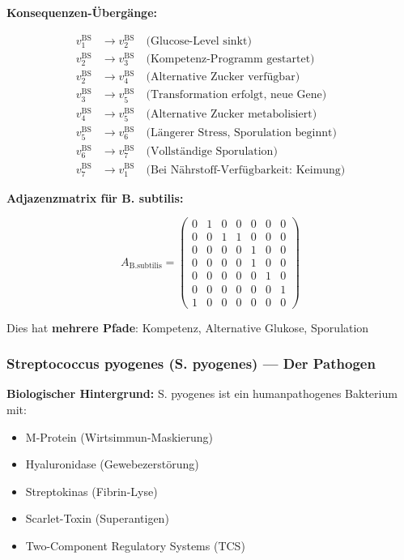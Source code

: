 \documentclass[a4paper,12pt]{article}
\theoremstyle{definition}
\begin{document}
\textbf{Konsequenzen-Übergänge:}

\begin{align*}
v_1^{\text{BS}} &\to v_2^{\text{BS}} \quad \text{(Glucose-Level sinkt)} \\
v_2^{\text{BS}} &\to v_3^{\text{BS}} \quad \text{(Kompetenz-Programm gestartet)} \\
v_2^{\text{BS}} &\to v_4^{\text{BS}} \quad \text{(Alternative Zucker verfügbar)} \\
v_3^{\text{BS}} &\to v_5^{\text{BS}} \quad \text{(Transformation erfolgt, neue Gene)} \\
v_4^{\text{BS}} &\to v_5^{\text{BS}} \quad \text{(Alternative Zucker metabolisiert)} \\
v_5^{\text{BS}} &\to v_6^{\text{BS}} \quad \text{(Längerer Stress, Sporulation beginnt)} \\
v_6^{\text{BS}} &\to v_7^{\text{BS}} \quad \text{(Vollständige Sporulation)} \\
v_7^{\text{BS}} &\to v_1^{\text{BS}} \quad \text{(Bei Nährstoff-Verfügbarkeit: Keimung)}
\end{align*}

\textbf{Adjazenzmatrix für B. subtilis:}

\[
A_{\text{B.subtilis}} = \begin{pmatrix}
0 & 1 & 0 & 0 & 0 & 0 & 0 \\
0 & 0 & 1 & 1 & 0 & 0 & 0 \\
0 & 0 & 0 & 0 & 1 & 0 & 0 \\
0 & 0 & 0 & 0 & 1 & 0 & 0 \\
0 & 0 & 0 & 0 & 0 & 1 & 0 \\
0 & 0 & 0 & 0 & 0 & 0 & 1 \\
1 & 0 & 0 & 0 & 0 & 0 & 0
\end{pmatrix}
\]

Dies hat \textbf{mehrere Pfade}: Kompetenz, Alternative Glukose, Sporulation

\subsubsection*{Streptococcus pyogenes (S. pyogenes) --- Der Pathogen}

\textbf{Biologischer Hintergrund:}
S. pyogenes ist ein humanpathogenes Bakterium mit:
\begin{itemize}
    \item M-Protein (Wirtsimmun-Maskierung)
    \item Hyaluronidase (Gewebezerstörung)
    \item Streptokinas (Fibrin-Lyse)
    \item Scarlet-Toxin (Superantigen)
    \item Two-Component Regulatory Systems (TCS)
\end{itemize}
\end{document}
